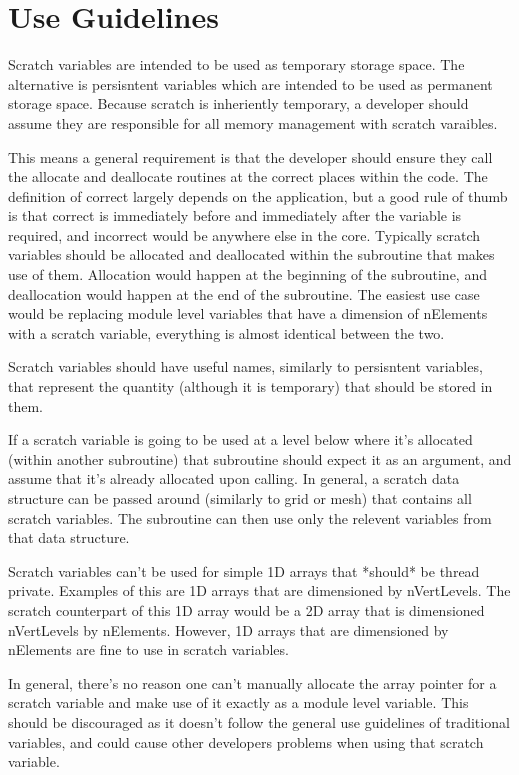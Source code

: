 \documentclass[11pt]{report}
\begin{document}

\chapter{Use Guidelines}

Scratch variables are intended to be used as temporary storage space. The
alternative is persisntent variables which are intended to be used as permanent
storage space. Because scratch is inheriently temporary, a developer should
assume they are responsible for all memory management with scratch varaibles. 

This means a general requirement is that the developer should ensure they call
the allocate and deallocate routines at the correct places within the code. The
definition of correct largely depends on the application, but a good rule of
thumb is that correct is immediately before and immediately after the variable
is required, and incorrect would be anywhere else in the core. Typically
scratch variables should be allocated and deallocated within the subroutine
that makes use of them. Allocation would happen at the beginning of the
subroutine, and deallocation would happen at the end of the subroutine. The
easiest use case would be replacing module level variables that have a
dimension of nElements with a scratch variable, everything is almost identical
between the two.

Scratch variables should have useful names, similarly to persisntent variables,
that represent the quantity (although it is temporary) that should be stored in
them.

If a scratch variable is going to be used at a level below where it's allocated
(within another subroutine) that subroutine should expect it as an argument,
and assume that it's already allocated upon calling. In general, a scratch data
structure can be passed around (similarly to grid or mesh) that contains all
scratch variables. The subroutine can then use only the relevent variables from
that data structure.

Scratch variables can't be used for simple 1D arrays that *should* be thread
private. Examples of this are 1D arrays that are dimensioned by nVertLevels.
The scratch counterpart of this 1D array would be a 2D array that is
dimensioned nVertLevels by nElements. However, 1D arrays that are dimensioned
by nElements are fine to use in scratch variables.

In general, there's no reason one can't manually allocate the array pointer for
a scratch variable and make use of it exactly as a module level variable. This
should be discouraged as it doesn't follow the general use guidelines of
traditional variables, and could cause other developers problems when using
that scratch variable.
\end{document}
